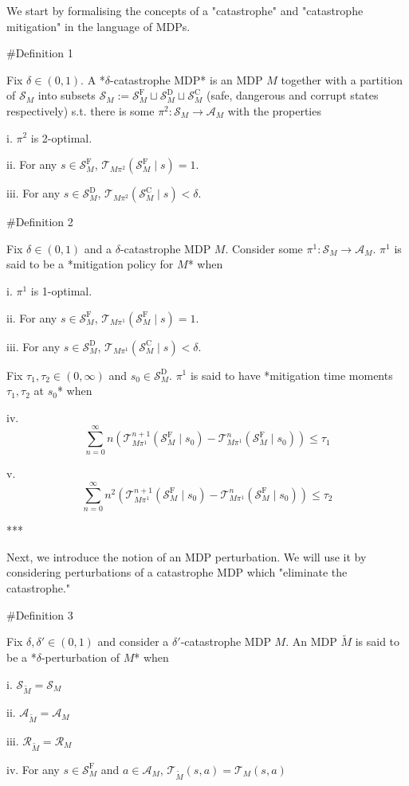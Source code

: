 \documentclass[a4paper]{article}
\newcommand{\AP}[1]{\left(#1\right)}
\newcommand{\A}{\mathcal{A}}
\newcommand{\St}{\mathcal{S}}
\newcommand{\T}{\mathcal{T}}
\newcommand{\R}{\mathcal{R}}
\newcommand{\SF}{\St^{\text{F}}}
\newcommand{\SD}{\St^{\text{D}}}
\newcommand{\SC}{\St^{\text{C}}}
\begin{document}
We start by formalising the concepts of a "catastrophe" and "catastrophe mitigation" in the language of MDPs.

\#Definition 1

Fix $\delta \in (0,1)$. A *$\delta$-catastrophe MDP* is an MDP $M$ together with a partition of $\St_M$ into subsets $\St_M:=\SF_M \sqcup \SD_M \sqcup \SC_M$ (safe, dangerous and corrupt states respectively) s.t. there is some $\pi^2: \St_M \rightarrow \A_M$ with the properties

i. $\pi^2$ is 2-optimal.

ii. For any $s \in \SF_M$, $\T_{M\pi^2}\AP{\SF_M \mid s}=1$.

iii. For any $s \in \SD_M$, $\T_{M\pi^2}\AP{\SC_M \mid s} < \delta$.

\#Definition 2

Fix $\delta\in(0,1)$ and a $\delta$-catastrophe MDP $M$. Consider some $\pi^1: \St_M \rightarrow \A_M$. $\pi^1$ is said to be a *mitigation policy for $M$* when

i. $\pi^1$ is 1-optimal.

ii. For any $s \in \SF_M$, $\T_{M\pi^1}\AP{\SF_M \mid s}=1$.

iii. For any $s \in \SD_M$, $\T_{M\pi^1}\AP{\SC_M \mid s} < \delta$.

Fix $\tau_1,\tau_2 \in (0,\infty)$ and $s_0 \in \SD_M$. $\pi^1$ is said to have *mitigation time moments $\tau_1,\tau_2$ at $s_0$* when

iv. $$\sum_{n=0}^\infty n \AP{\T_{M\pi^1}^{n+1}\AP{\SF_M \mid s_0}-\T_{M\pi^1}^{n}\AP{\SF_M \mid s_0}} \leq \tau_1$$

v. $$\sum_{n=0}^\infty n^2 \AP{\T_{M\pi^1}^{n+1}\AP{\SF_M \mid s_0}-\T_{M\pi^1}^{n}\AP{\SF_M \mid s_0}} \leq \tau_2$$

***

Next, we introduce the notion of an MDP perturbation. We will use it by considering perturbations of a catastrophe MDP which "eliminate the catastrophe."

\#Definition 3

Fix $\delta,\delta'\in(0,1)$ and consider a $\delta'$-catastrophe MDP $M$. An MDP $\tilde{M}$ is said to be a *$\delta$-perturbation of $M$* when

i. $\St_{\tilde{M}} = \St_M$

ii. $\A_{\tilde{M}} = \A_M$

iii. $\R_{\tilde{M}}=\R_M$

iv. For any $s \in \SF_M$ and $a \in \A_M$, $\T_{\tilde{M}}\AP{s,a}=\T_{M}\AP{s,a}$
\end{document}
